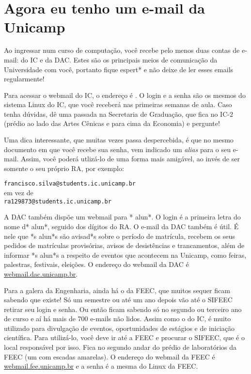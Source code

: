 
\section{Agora eu tenho um e-mail da Unicamp}

Ao ingressar num curso de computação, você recebe pelo menos duas contas de
e-mail: do IC e da DAC. Estes são os principais meios de comunicação da
Universidade com você, portanto fique espert* e não deixe de ler esses emails
regularmente!

Para acessar o webmail do IC, o endereço é
.  O login e a senha são os
mesmos do sistema Linux do IC, que você receberá nas primeiras semanas de
aula. Caso tenha dúvidas, dê uma passada na Secretaria de Graduação, que fica no
IC-2 (prédio ao lado das Artes Cênicas e para cima da Economia) e pergunte!

Uma dica interessante, que muitas vezes passa despercebida, é que no mesmo
documento em que você recebe sua senha, vem indicado um {\it alias} para o seu
e-mail. Assim, você poderá utlizá-lo de uma forma mais amigável, ao invés de ser
somente o seu próprio RA, por exemplo:

\begin{center}
\texttt{francisco.silva@students.ic.unicamp.br}\\
em vez de\\
\texttt{ra129873@students.ic.unicamp.br}
\end{center}

A DAC também dispõe um webmail para * alun*. O login é a primeira letra do nome
d* alun*, seguido dos dígitos do RA. O e-mail da DAC também é útil. É nele que
*s alun*s são avisad*s sobre o período de matrícula, recebem os seus pedidos de
matrículas provisórias, avisos de desistências e trancamentos, além de informar
*s alun*s a respeito de eventos que acontecem na Unicamp, como feiras,
palestras, festivais, eleições. O endereço do webmail da DAC é
\url{webmail.dac.unicamp.br}.

Para a galera da Engenharia, ainda há o da FEEC, que muitos sequer ficam
sabendo que existe! Só um semestre ou até um ano depois vão até o SIFEEC retirar
seu login e senha. Ou então ficam sabendo só no segundo ou terceiro ano de curso
e aí há mais de 700 e-mails não lidos. Assim como o do IC, é muito utilizado
para divulgação de eventos, oportunidades de estágios e de iniciação científica.
Para utilizá-lo, você deve ir até a FEEC e procurar o SIFEEC, que é o local
responsável por isso. Fica no segundo andar do prédio de laboratórios da FEEC
(um com escadas amarelas). O endereço do webmail da FEEC é
\url{webmail.fee.unicamp.br} e a senha é a mesma do Linux da FEEC.

